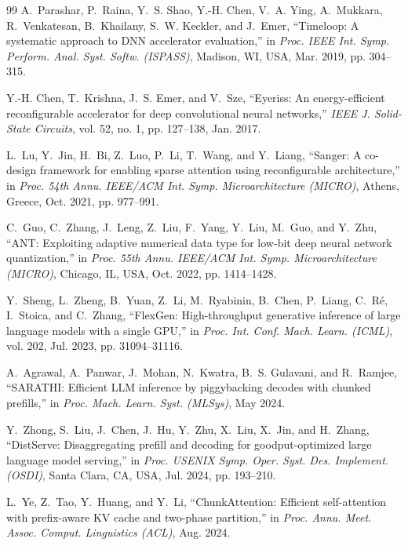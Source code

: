 \documentclass{ieeeaccess}
\begin{document}
\begin{thebibliography}{99}
A.~Parashar, P.~Raina, Y.~S. Shao, Y.-H. Chen, V.~A. Ying, A.~Mukkara, R.~Venkatesan, B.~Khailany, S.~W. Keckler, and J.~Emer,
``Timeloop: A systematic approach to DNN accelerator evaluation,''
in \emph{Proc. IEEE Int. Symp. Perform. Anal. Syst. Softw. (ISPASS)}, Madison, WI, USA, Mar. 2019, pp. 304--315.

Y.-H. Chen, T.~Krishna, J.~S. Emer, and V.~Sze,
``Eyeriss: An energy-efficient reconfigurable accelerator for deep convolutional neural networks,''
\emph{IEEE J. Solid-State Circuits}, vol. 52, no. 1, pp. 127--138, Jan. 2017.

L.~Lu, Y.~Jin, H.~Bi, Z.~Luo, P.~Li, T.~Wang, and Y.~Liang,
``Sanger: A co-design framework for enabling sparse attention using reconfigurable architecture,''
in \emph{Proc. 54th Annu. IEEE/ACM Int. Symp. Microarchitecture (MICRO)}, Athens, Greece, Oct. 2021, pp. 977--991.

C.~Guo, C.~Zhang, J.~Leng, Z.~Liu, F.~Yang, Y.~Liu, M.~Guo, and Y.~Zhu,
``ANT: Exploiting adaptive numerical data type for low-bit deep neural network quantization,''
in \emph{Proc. 55th Annu. IEEE/ACM Int. Symp. Microarchitecture (MICRO)}, Chicago, IL, USA, Oct. 2022, pp. 1414--1428.

Y.~Sheng, L.~Zheng, B.~Yuan, Z.~Li, M.~Ryabinin, B.~Chen, P.~Liang, C.~R\'e, I.~Stoica, and C.~Zhang,
``FlexGen: High-throughput generative inference of large language models with a single GPU,''
in \emph{Proc. Int. Conf. Mach. Learn. (ICML)}, vol. 202, Jul. 2023, pp. 31094--31116.

A.~Agrawal, A.~Panwar, J.~Mohan, N.~Kwatra, B.~S. Gulavani, and R.~Ramjee,
``SARATHI: Efficient LLM inference by piggybacking decodes with chunked prefills,''
in \emph{Proc. Mach. Learn. Syst. (MLSys)}, May 2024.

Y.~Zhong, S.~Liu, J.~Chen, J.~Hu, Y.~Zhu, X.~Liu, X.~Jin, and H.~Zhang,
``DistServe: Disaggregating prefill and decoding for goodput-optimized large language model serving,''
in \emph{Proc. USENIX Symp. Oper. Syst. Des. Implement. (OSDI)}, Santa Clara, CA, USA, Jul. 2024, pp. 193--210.

L.~Ye, Z.~Tao, Y.~Huang, and Y.~Li,
``ChunkAttention: Efficient self-attention with prefix-aware KV cache and two-phase partition,''
in \emph{Proc. Annu. Meet. Assoc. Comput. Linguistics (ACL)}, Aug. 2024.


\end{thebibliography}
\end{document}

